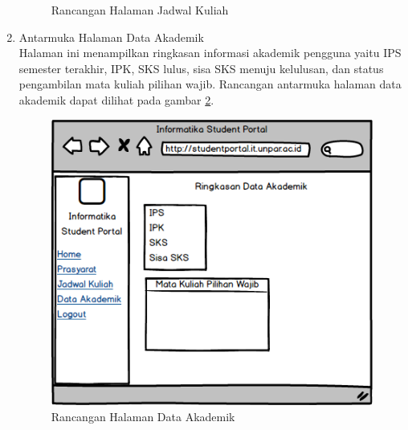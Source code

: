 \begin{enumerate}
\begin{figure}[H]
			\caption{Rancangan Halaman Jadwal Kuliah} 
			\label{fig:4_ranc_kuliah}
		\end{figure}
	\item {Antarmuka Halaman Data Akademik}\\
	Halaman ini menampilkan ringkasan informasi akademik pengguna yaitu IPS semester terakhir, IPK, SKS lulus, sisa SKS menuju kelulusan, dan status pengambilan mata kuliah pilihan wajib. Rancangan antarmuka halaman data akademik dapat dilihat pada gambar \ref{fig:4_ranc_ringkasan}.
	\begin{figure}[H]
			\centering
			\includegraphics[scale=0.5]{Gambar/Ringkasan_Page}
			\caption{Rancangan Halaman Data Akademik} 
			\label{fig:4_ranc_ringkasan}
		\end{figure}
\end{enumerate}
